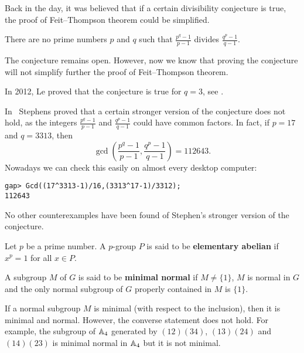 Back in the day, it was believed that if a certain divisibility 
conjecture is true, 
the proof of Feit--Thompson theorem 
could be simplified. 

\begin{conjecture}
    There are no prime numbers $p$ and $q$ such that
    $\frac {p^{q}-1}{p-1}$ divides $\frac{q^{p} - 1}{q - 1}$. 
\end{conjecture}

The conjecture remains open. However, now we know that 
proving the conjecture will not simplify further
the proof of Feit--Thompson theorem. 

In 2012, Le proved that the conjecture is true for $q=3$, see 
\cite{MR2900154}. 

In~\cite{MR297686} 
Stephens proved that a certain stronger version of the conjecture 
does not hold, as the integers 
$\frac {p^{q}-1}{p-1}$ and $\frac{q^{p} - 1}{q - 1}$ 
could have common factors. In fact, if $p=17$ and $q=3313$, 
then 
\[
\gcd\left(\frac {p^{q}-1}{p-1},\frac{q^{p} - 1}{q - 1}\right)=112643.
\]
Nowadays we can check this easily on almost every desktop computer:
\begin{lstlisting}
gap> Gcd((17^3313-1)/16,(3313^17-1)/3312);
112643
\end{lstlisting}
No other counterexamples have been found of Stephen’s 
stronger version of the conjecture.

\begin{definition}
Let $p$ be a prime number. A $p$-group $P$ is said to be 
\textbf{elementary abelian} if $x^p=1$ for all $x\in P$.
\end{definition}

\begin{definition}
A subgroup $M$ of $G$ is said to be \textbf{minimal normal} if $M\ne\{1\}$,
$M$ is normal in $G$ and the only normal 
subgroup of $G$ properly contained in $M$ is $\{1\}$. 
\end{definition}

\begin{example}
    If a normal subgroup $M$ is minimal (with respect to the inclusion), 
    then it is minimal and normal. However, 
    the converse statement does not hold. For example, the subgroup
    of $\mathbb{A}_4$ generated by $(12)(34)$, $(13)(24)$ and $(14)(23)$ is minimal normal in $\mathbb{A}_4$ 
    but it is not minimal. 
\end{example}

